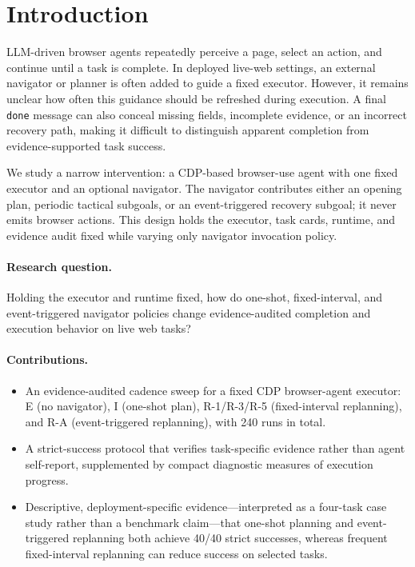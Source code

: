 \documentclass[runningheads]{llncs}
\begin{document}
\section{Introduction}

LLM-driven browser agents repeatedly perceive a page, select an action, and
continue until a task is complete. In deployed live-web settings, an external
navigator or planner is often added to guide a fixed executor. However, it
remains unclear how often this guidance should be refreshed during execution.
A final \texttt{done} message can also conceal missing fields, incomplete
evidence, or an incorrect recovery path, making it difficult to distinguish
apparent completion from evidence-supported task success.

We study a narrow intervention: a CDP-based browser-use agent with one fixed
executor and an optional navigator. The navigator contributes either an opening
plan, periodic tactical subgoals, or an event-triggered recovery subgoal; it never
emits browser actions. This design holds the executor, task cards, runtime, and
evidence audit fixed while varying only navigator invocation policy.

\paragraph{Research question.} Holding the executor and runtime fixed, how do
one-shot, fixed-interval, and event-triggered navigator policies change
evidence-audited completion and execution behavior on live web tasks?

\paragraph{Contributions.}
\begin{itemize}
  \item An evidence-audited cadence sweep for a fixed CDP browser-agent
  executor: E (no navigator), I (one-shot plan), R-1/R-3/R-5
  (fixed-interval replanning), and R-A (event-triggered replanning), with
  240 runs in total.
  \item A strict-success protocol that verifies task-specific evidence rather
  than agent self-report, supplemented by compact diagnostic measures of
  execution progress.
  \item Descriptive, deployment-specific evidence---interpreted as a four-task
  case study rather than a benchmark claim---that one-shot planning and
  event-triggered replanning both achieve 40/40 strict successes, whereas
  frequent fixed-interval replanning can reduce success on selected tasks.
\end{itemize}
\end{document}
